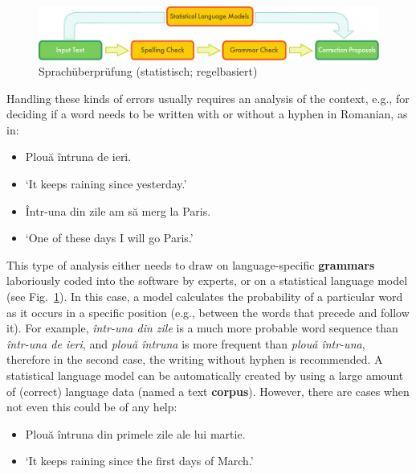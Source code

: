 \documentclass[]{../../metanetpaper}
\begin{document}
\begin{multicols}{2}
\begin{figure}[htb]
\center
\includegraphics[width=\textwidth]{../_media/english/language_checking}
\caption{Sprachüberprüfung (statistisch; regelbasiert)}
\label{fig:langcheckingaarch_de}
\end{figure}

Handling these kinds of errors usually requires an analysis of the context, e.g., for deciding if a word needs to be written with or without a hyphen in Romanian, as in:

\begin{example}
\begin{itemize}
\item []Plouă întruna de ieri.
\item []`It keeps raining since yesterday.'
\end{itemize}
\end{example}

\begin{example}
\begin{itemize}
\item []Într-una din zile am să merg la Paris.
\item []`One of these days I will go Paris.'
\end{itemize}
\end{example}

This type of analysis either needs to draw on language-specific \textbf{grammars} laboriously coded into the software by experts, or on a  statistical language model (see Fig.~\ref{fig:langcheckingaarch_de}). In this case, a model calculates the probability of a particular word as it occurs in a specific position (e.g., between the words that precede and follow it). For example, \textit{într-una din zile} is a much more probable word sequence than \textit{într-una de ieri}, and \textit{plouă întruna} is more frequent than \textit{plouă într-una}, therefore in the second case, the writing without hyphen is recommended. A statistical language model can be automatically created by using a large amount of (correct) language data (named a text \textbf{corpus}). However, there are cases when not even this could be of any help:

\begin{example}
\begin{itemize}
\item []Plouă întruna din primele zile ale lui martie.
\item []`It keeps raining since the first days of March.'
\end{itemize}
\end{example}


\end{multicols}
\end{document}

